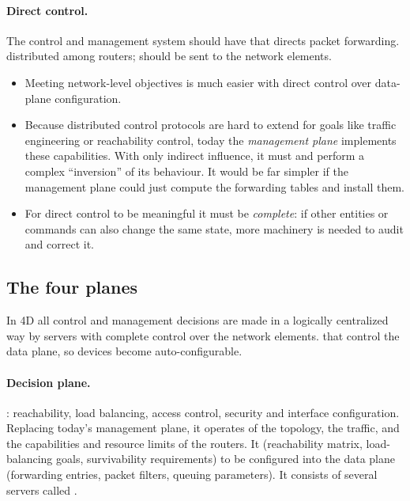 \paragraph{Direct control.} The control and management system should have  that directs packet forwarding.  distributed among routers;  should be sent to the network elements.
\begin{itemize}
\item Meeting network-level objectives is much easier with direct control over data-plane configuration.
\item Because distributed control protocols are hard to extend for goals like traffic engineering or reachability control, today the \emph{management plane} implements these capabilities. With only indirect influence, it must  and perform a complex ``inversion'' of its behaviour. It would be far simpler if the management plane could just compute the forwarding tables and install them.
\item For direct control to be meaningful it must be \emph{complete}: if other entities or commands can also change the same state, more machinery is needed to audit and correct it.
\end{itemize}

\subsection{The four planes}
In 4D all control and management decisions are made in a logically centralized way by servers with complete control over the network elements.  that control the data plane, so devices become auto-configurable.

\paragraph{Decision plane.} : reachability, load balancing, access control, security and interface configuration. Replacing today's management plane, it operates  of the topology, the traffic, and the capabilities and resource limits of the routers. It  (reachability matrix, load-balancing goals, survivability requirements)  to be configured into the data plane (forwarding entries, packet filters, queuing parameters). It consists of several servers called .


